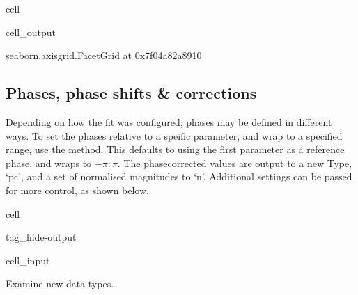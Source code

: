 \documentclass[letterpaper,table,10pt,english]{jupyterBook}
\begin{document}
\begin{sphinxuseclass}{cell}
\begin{sphinxVerbatimOutput}
\begin{sphinxuseclass}{cell_output}
\begin{sphinxVerbatim}[commandchars=\\\{\}]
\PYGZlt{}seaborn.axisgrid.FacetGrid at 0x7f04a82a8910\PYGZgt{}
\end{sphinxVerbatim}

\noindent{}

\end{sphinxuseclass}\end{sphinxVerbatimOutput}

\end{sphinxuseclass}

\subsection{Phases, phase shifts \& corrections}
\label{\detokenize{part2/case-study-C2H4_290723:phases-phase-shifts-corrections}}
\sphinxAtStartPar
Depending on how the fit was configured, phases may be defined in different ways. To set the phases relative to a speific parameter, and wrap to a specified range, use the  method. This defaults to using the first parameter as a reference phase, and wraps to \(-\pi:\pi\). The phase\sphinxhyphen{}corrected values are output to a new Type, ‘pc’, and a set of normalised magnitudes to ‘n’. Additional settings can be passed for more control, as shown below.

\begin{sphinxuseclass}{cell}
\begin{sphinxuseclass}{tag_hide-output}\begin{sphinxVerbatimInput}

\begin{sphinxuseclass}{cell_input}
\begin{sphinxVerbatim}[commandchars=\\\{\}]
 
\end{sphinxVerbatim}

\end{sphinxuseclass}\end{sphinxVerbatimInput}

\end{sphinxuseclass}
\end{sphinxuseclass}
\sphinxAtStartPar
Examine new data types…
\end{document}
